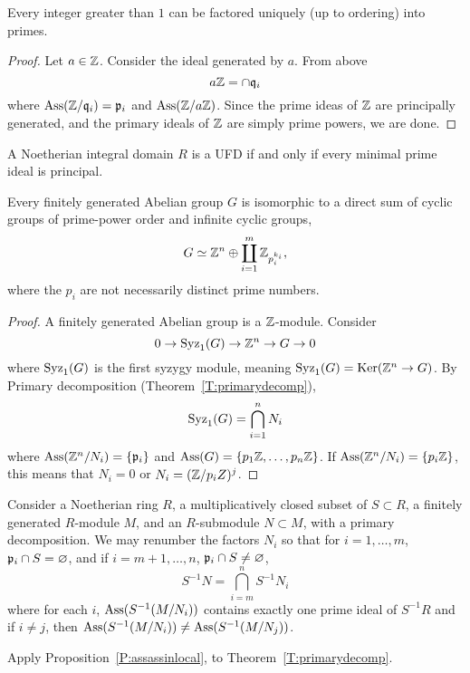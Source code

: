 \documentclass{ximera}
\begin{document}
\begin{theorem}
  Every integer greater than $1$ can be factored uniquely (up to
  ordering) into primes.
  \begin{proof}
    Let $a\in\mathbb Z$. Consider the ideal generated by $a$. From above
    \[
    a\mathbb Z = \cap \mathfrak{q}_i
    \]
    where $\operatorname{Ass}(\mathbb Z/\mathfrak{q}_i) = \mathfrak{p}_i$ and $\operatorname{Ass}(\mathbb Z/a\mathbb Z)$. Since the prime
    ideas of $\mathbb Z$ are principally generated, and the primary ideals of
    $\mathbb Z$ are simply prime powers, we are done.
  \end{proof}
\end{theorem}

\begin{exercise}%
   A Noetherian integral domain $R$ is a UFD if and only if every minimal
   prime ideal is principal.
\end{exercise}

\begin{theorem}
  Every finitely generated Abelian group $G$ is isomorphic to a
  direct sum of cyclic groups of prime-power order and infinite cyclic
  groups,
  \[
  G \simeq \mathbb Z^n \oplus \coprod_{i=1}^{m} \mathbb Z_{p_i^{k_i}},
  \]
  where the $p_i$ are not necessarily distinct prime numbers.
  \begin{proof}
    A finitely generated Abelian group is a $\mathbb Z$-module. Consider
    \[
    0 \to \operatorname{Syz}_1(G) \to \mathbb Z^n \to G \to 0 
    \]
    where $\operatorname{Syz}_1(G)$ is the first syzygy module, meaning $\operatorname{Syz}_1(G) =
    \mathop{\mathrm{Ker}}\nolimits(\mathbb Z^n \to G)$. By Primary decomposition (Theorem~\ref{T:primarydecomp}),
    \[
    \operatorname{Syz}_1(G) = \bigcap_{i=1}^n N_i
    \]
    where $\operatorname{Ass}(\mathbb Z^n/N_i) = \{\mathfrak{p}_i\}$ and $\operatorname{Ass}(G) =
    \{p_1\mathbb Z,\dots,p_n\mathbb Z\}$. If $\operatorname{Ass}(\mathbb Z^n/N_i) = \{p_i\mathbb Z\}$, this
    means that $N_i = 0$ or $N_i = (\mathbb Z/p_iZ)^j$.
  \end{proof}
\end{theorem}


\begin{theorem}
  Consider a Noetherian ring $R$, a multiplicatively closed subset of
  $S\subset R$, a finitely generated $R$-module $M$, and an
  $R$-submodule $N\subset M$, with a primary decomposition. We may
  renumber the factors $N_i$ so that for $i=1,\dots, m$, $\mathfrak{p}_i\cap S
  =\varnothing$, and if $i=m+1,\dots, n$, $\mathfrak{p}_i\cap S \ne\varnothing$,
  \[
  S^{-1}N = \bigcap_{i=m}^n S^{-1}N_i
  \]
  where for each $i$, $\operatorname{Ass}(S^{-1}(M/N_i))$ contains exactly one prime ideal
  of $S^{-1}R$ and if $i\ne j$, then $\operatorname{Ass}(S^{-1}(M/N_i)) \ne \operatorname{Ass}(S^{-1}(M/N_j))$.
  \begin{sketch}
    Apply Proposition~\ref{P:assassinlocal}, to Theorem~\ref{T:primarydecomp}.
  \end{sketch}
\end{theorem}
\end{document}
